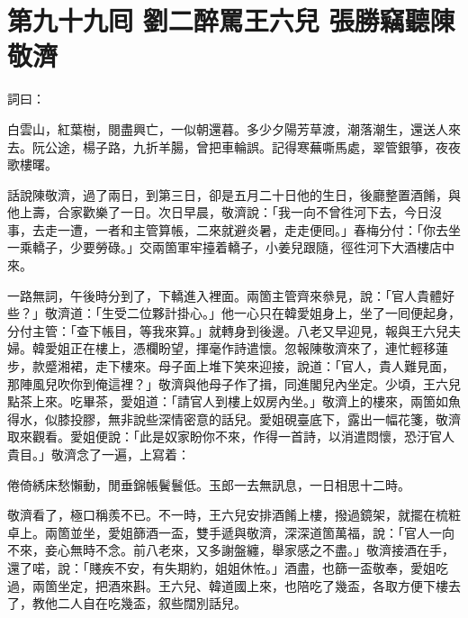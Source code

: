 
\chapter*{第九十九囘 劉二醉罵王六兒 張勝竊聽陳敬濟}


詞曰：

\begin{myquote}
白雲山，紅葉樹，閱盡興亡，一似朝還暮。多少夕陽芳草渡，潮落潮生，還送人來去。阮公途，楊子路，九折羊腸，曾把車輪誤。記得寒蕪嘶馬處，翠管銀箏，夜夜歌樓曙。

\end{myquote}

話說陳敬濟，過了兩日，到第三日，卻是五月二十日他的生日，後廳整置酒餚，與他上壽，合家歡樂了一日。次日早晨，敬濟說：「我一向不曾徃河下去，今日沒事，去走一遭，一者和主管算帳，二來就避炎暑，走走便囘。」春梅分付：「你去坐一乘轎子，少要勞碌。」交兩箇軍牢擡着轎子，小姜兒跟隨，徑徃河下大酒樓店中來。

一路無詞，午後時分到了，下轎進入裡面。兩箇主管齊來叅見，說：「官人貴體好些？」敬濟道：「生受二位夥計掛心。」他一心只在韓愛姐身上，坐了一囘便起身，分付主管：「查下帳目，等我來算。」就轉身到後邊。八老又早迎見，報與王六兒夫婦。韓愛姐正在樓上，憑欄盼望，揮毫作詩遣懷。忽報陳敬濟來了，連忙輕移蓮步，款蹙湘裙，走下樓來。母子面上堆下笑來迎接，說道：「官人，貴人難見面，那陣風兒吹你到俺這裡？」敬濟與他母子作了揖，同進閣兒內坐定。少頃，王六兒點茶上來。吃畢茶，愛姐道：「請官人到樓上奴房內坐。」敬濟上的樓來，兩箇如魚得水，似膝投膠，無非說些深情密意的話兒。愛姐硯臺底下，露出一幅花箋，敬濟取來觀看。愛姐便說：「此是奴家盼你不來，作得一首詩，以消遣悶懷，恐汙官人貴目。」敬濟念了一遍，上寫着：

\begin{myquote}[\markfont]
倦倚綉床愁懶動，閒垂錦帳鬢鬟低。玉郎一去無訊息，一日相思十二時。
\end{myquote}

敬濟看了，極口稱羨不已。不一時，王六兒安排酒餚上樓，撥過鏡架，就擺在梳粧卓上。兩箇並坐，愛姐篩酒一盃，雙手遞與敬濟，深深道箇萬福，說：「官人一向不來，妾心無時不念。前八老來，又多謝盤纏，舉家感之不盡。」敬濟接酒在手，還了喏，說：「賤疾不安，有失期約，姐姐休恠。」酒盡，也篩一盃敬奉，愛姐吃過，兩箇坐定，把酒來斟。王六兒、韓道國上來，也陪吃了幾盃，各取方便下樓去了，{}教他二人自在吃幾盃，叙些闊別話兒。

